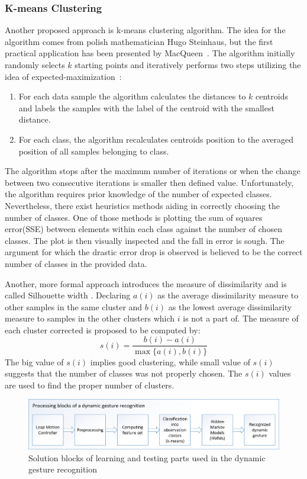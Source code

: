 \subsubsection*{K-means Clustering}
Another proposed approach is k-means clustering algorithm.
The idea for the algorithm comes from polish mathematician Hugo Steinhaus, but the first practical application has been presented by MacQueen~\cite{kmeans2}.
The algorithm initially randomly selects $k$ starting points and iteratively performs two steps utilizing the idea of expected-maximization~\cite{expectedmaximization}:
\begin{enumerate}
\item For each data sample the algorithm calculates the distances to $k$ centroids and labels the samples with the label of the centroid with the smallest distance.
\item For each class, the algorithm recalculates centroids position to the averaged position of all samples belonging to class.
\end{enumerate} 
The algorithm stops after the maximum number of iterations or when the change between two consecutive iterations is smaller then defined value.
Unfortunately, the algorithm requires prior knowledge of the number of expected classes.
Nevertheless, there exist heuristics methods aiding in correctly choosing the number of classes. 
One of those methods is plotting the sum of squares error(SSE) between elements within each class against the number of chosen classes. 
The plot is then visually inspected and the fall in error is sough.
The argument for which the drastic error drop is observed is believed to be the correct number of classes in the provided data.

Another, more formal approach introduces the measure of dissimilarity and is called Silhouette width \cite{silhouette}.
Declaring $a(i)$ as the average dissimilarity measure to other samples in the same cluster and $b(i)$ as the lowest average dissimilarity measure to samples in the other clusters which $i$ is not a part of.
The measure of each cluster corrected is proposed to be computed by:
\begin{equation}
s(i) = \frac{b(i) - a(i)}{\max{\{a(i),b(i)}\}}
\end{equation}
The big value of $s(i)$ implies good clustering, while small value of $s(i)$ suggests that the number of classes was not properly chosen.
The $s(i)$ values are used to find the proper number of clusters.


\begin{figure}[htb]
\centering
 \includegraphics[width=1\columnwidth]{figures/DynamicGestures2.jpg}
 \caption{Solution blocks of learning and testing parts used in the dynamic gesture recognition}
 \label{dynamicgesturesflow}
\end{figure}

